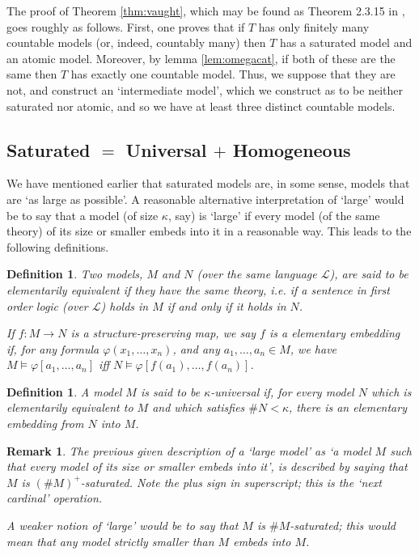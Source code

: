 \documentclass{article}
\newtheorem{remark}[theorem]{Remark}
\newtheorem{definition}[theorem]{Definition}
\theoremstyle{nonumberplain}
\newcommand{\Lang}{\mathcal{L}}
\newcommand{\card}[1]{\#{#1}}
\begin{document}
The proof of Theorem \ref{thm:vaught}, which may be found as Theorem 2.3.15 in \cite{cnk}, goes roughly as follows. First, one proves that if $T$ has only finitely many countable models (or, indeed, countably many) then $T$ has a saturated model and an atomic model. Moreover, by lemma \ref{lem:omegacat}, if both of these are the same then $T$ has exactly one countable model. Thus, we suppose that they are not, and construct an `intermediate model', which we construct as to be neither saturated nor atomic, and so we have at least three distinct countable models.

\subsection{Saturated $=$ Universal $+$ Homogeneous}

We have mentioned earlier that saturated models are, in some sense, models that are `as large as possible'. A reasonable alternative interpretation of `large'  would be to say that a model (of size $\kappa$, say) is `large' if every model (of the same theory) of its size or smaller embeds into it in a reasonable way. This leads to the following definitions.
\begin{definition}
Two models, $M$ and $N$ (over the same language $\Lang$), are said to be \emph{elementarily equivalent} if they have the same theory, i.e. if a sentence in first order logic (over $\Lang$) holds in $M$ if and only if it holds in $N$.

If $f \colon M \to N$ is a structure-preserving map, we say $f$ is a \emph{elementary embedding} if, for any formula $\varphi(x_1, \dots, x_n)$, and any $a_1, \dots, a_n \in M$, we have $M \vDash \varphi[a_1, \dots, a_n]$ iff $N \vDash \varphi[f(a_1),\dots,f(a_n)]$.
\end{definition}

\begin{definition}
A model $M$ is said to be \emph{$\kappa$-universal} if, for every model $N$ which is elementarily equivalent to $M$ and which satisfies $\card N < \kappa$, there is an elementary embedding from $N$ into $M$.
\end{definition}

\begin{remark}
The previous given description of a `large model' as `a model $M$ such that every model of its size or smaller embeds into it', is described by saying that $M$ is $(\card M)^+$-saturated. Note the plus sign in superscript; this is the `next cardinal' operation.

A weaker notion of `large' would be to say that $M$ is $\card M$-saturated; this would mean that any model \emph{strictly} smaller than $M$ embeds into $M$.
\end{remark}
\end{document}
